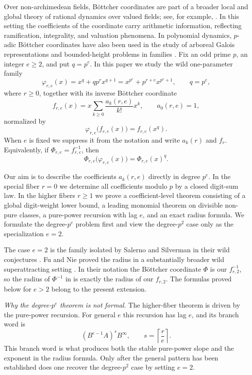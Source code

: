 \documentclass[11pt]{amsart}
\numberwithin{equation}{section}
\begin{document}
Over non-archimedean fields, B\"ottcher coordinates are part of a broader local and global theory of rational dynamics over valued fields; see, for example, \cite{BakerRumely,Benedetto,FavreRiveraLetelier, Lubin,RiveraLetelier,SilvermanADS}.  In this setting the coefficients of the coordinate carry arithmetic information, reflecting ramification, integrality, and valuation phenomena.  In polynomial dynamics, $p$-adic B\"ottcher coordinates have also been used in the study of arboreal Galois representations and bounded-height problems in families \cite{DeMarcoGhiocaKriegerNguyenTuckerYe,Ingram}.  Fix an odd prime $p$, an integer $e\ge 2$, and put $q=p^e$.  In this paper we study the wild one-parameter family
\begin{equation}\label{eq:main-family}
        \varphi_{r,e}(x)=x^q+qp^r x^{q+1}=x^{p^e}+p^{r+e}x^{p^e+1},
        \qquad q=p^e,
\end{equation}
where $r\ge 0$, together with its inverse B\"ottcher coordinate
\[
        f_{r,e}(x)=x\sum_{k\ge 0}\frac{a_k(r,e)}{k!}x^k,
        \qquad a_0(r,e)=1,
\]
normalized by
\[
        \varphi_{r,e}\bigl(f_{r,e}(x)\bigr)=f_{r,e}(x^q).
\]
When $e$ is fixed we suppress it from the notation and write $a_k(r)$ and $f_r$.  Equivalently, if $\Phi_{r,e}=f_{r,e}^{-1}$, then
\[
        \Phi_{r,e}\bigl(\varphi_{r,e}(x)\bigr)=\Phi_{r,e}(x)^q.
\]

Our aim is to describe the coefficients $a_k(r,e)$ directly in degree $p^e$.  In the special fiber $r=0$ we determine all coefficients modulo $p$ by a closed digit-sum law.  In the higher fibers $r\ge1$ we prove a coefficient-level theorem consisting of a global digit-weight lower bound, a leading monomial theorem on divisible non-pure classes, a pure-power recursion with lag $e$, and an exact radius formula.  We formulate the degree-$p^e$ problem first and view the degree-$p^2$ case only as the specialization $e=2$.

The case $e=2$ is the family isolated by Salerno and Silverman in their wild conjectures \cite{SalernoSilverman}.  Fu and Nie proved the radius in a substantially broader wild superattracting setting \cite{FuNie}.  In their notation the B\"ottcher coordinate $\Phi$ is our $f_{r,2}^{-1}$, so the radius of $\Phi^{-1}$ in \cite{FuNie} is exactly the radius of our $f_{r,2}$.  The formulas proved below for $e>2$ belong to the present extension.

\medskip
\noindent\emph{Why the degree-$p^e$ theorem is not formal.}
The higher-fiber theorem is driven by the pure-power recursion.  For general $e$ this recursion has lag $e$, and its branch word is
\[
        (B^{e-1}A)^sB^\infty,
        \qquad s=\left\lceil\frac r e\right\rceil.
\]
This branch word is what produces both the stable pure-power slope and the exponent in the radius formula.  Only after the general pattern has been established does one recover the degree-$p^2$ case by setting $e=2$.
\end{document}
